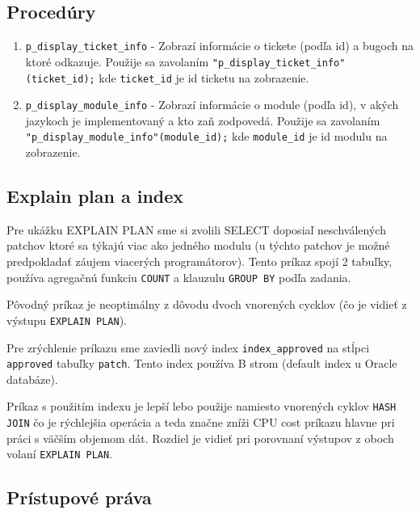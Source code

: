 \documentclass[11pt, a4paper]{article}
\begin{document}
    \subsection{Procedúry}\label{subsec:procedúry}

    \begin{enumerate}
        \item \texttt{p\_display\_ticket\_info} -
        Zobrazí informácie o tickete (podľa id) a bugoch na ktoré odkazuje.
        Použije sa zavolaním \texttt{"p\_display\_ticket\_info"(ticket\_id);} kde \texttt{ticket\_id} je id ticketu na zobrazenie.

        \item \texttt{p\_display\_module\_info} -
        Zobrazí informácie o module (podľa id), v akých jazykoch je implementovaný a kto zaň zodpovedá.
        Použije sa zavolaním \texttt{"p\_display\_module\_info"(module\_id);} kde \texttt{module\_id} je id modulu na zobrazenie.
    \end{enumerate}

    \subsection{Explain plan a index}\label{subsec:explain-plan-+-index}
    Pre ukážku EXPLAIN PLAN sme si zvolili SELECT doposiaľ neschválených patchov ktoré sa týkajú viac ako jedného modulu (u týchto patchov je možné predpokladať záujem viacerých programátorov).
    Tento príkaz spojí 2 tabuľky, používa agregačnú funkciu \texttt{COUNT} a klauzulu \texttt{GROUP BY} podľa zadania.

    Pôvodný príkaz je neoptimálny z dôvodu dvoch vnorených cycklov (čo je vidieť z výstupu \texttt{EXPLAIN PLAN}).

    Pre zrýchlenie príkazu sme zaviedli nový index \texttt{index\_approved} na stĺpci \texttt{approved} tabuľky \texttt{patch}.
    Tento index používa B strom (default index u Oracle databáze).

    Príkaz s použitím indexu je lepší lebo použije namiesto vnorených cyklov \texttt{HASH JOIN} čo je rýchlejšia operácia a teda značne zníži CPU cost príkazu hlavne pri práci s väčším objemom dát.
    Rozdiel je vidieť pri porovnaní výstupov z oboch volaní \texttt{EXPLAIN PLAN}.

    \subsection{Prístupové práva}\label{subsec:prístupové-práva}
\end{document}
